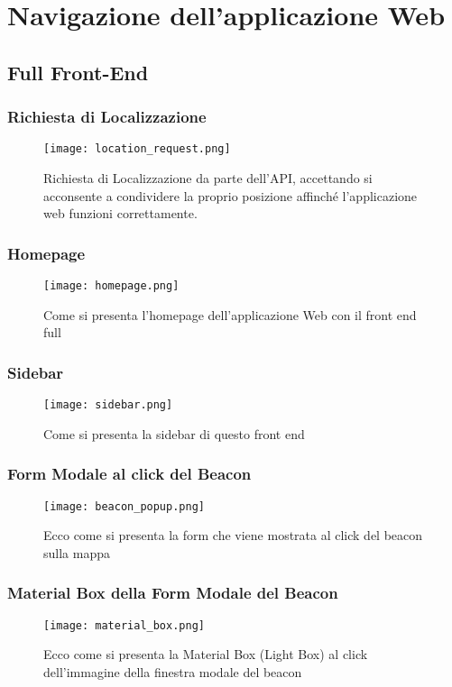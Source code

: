 \section{Navigazione dell'applicazione Web}

\subsection{Full Front-End}
\subsubsection{Richiesta di Localizzazione}
\begin{figure}[H]
	\centering
	\caption{Richiesta di Localizzazione da parte dell'API, accettando si acconsente a condividere la proprio posizione affinché l'applicazione web funzioni correttamente.}
	\texttt{[image: location\_request.png]}
\end{figure} 
\newpage
\subsubsection{Homepage}
\begin{figure}[H]
	\centering
	\caption{Come si presenta l'homepage dell'applicazione Web con il front end full} 
	\texttt{[image: homepage.png]}
\end{figure} 
\newpage

\subsubsection{Sidebar}
\begin{figure}[H]
	\centering
	\caption{Come si presenta la sidebar di questo front end}
	\texttt{[image: sidebar.png]}
\end{figure} 
\newpage

\subsubsection{Form Modale al click del Beacon}
\begin{figure}[H]
	\centering
	\caption{Ecco come si presenta la form che viene mostrata al click del beacon sulla mappa}
	\texttt{[image: beacon\_popup.png]}
\end{figure} 
\newpage

\subsubsection{Material Box della Form Modale del Beacon}
\begin{figure}[h]
	\centering
	\caption{Ecco come si presenta la Material Box (Light Box) al click dell'immagine della finestra modale del beacon}
	\texttt{[image: material\_box.png]}
\end{figure} 
\newpage


